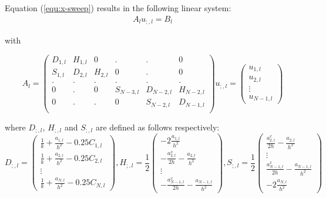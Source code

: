 \documentclass[12pt]{article}
\begin{document}
Equation (\ref{equ:x-sweep}) results in the following linear system:
\begin{eqnarray}
  A_l u_{;,l} = B_l
  \label{equ:xsweep_lin}
\end{eqnarray}



with
 
\[ A_l = \left( \begin{array}{cccccc}
D_{1,l} & H_{1,l} & 0 & . & . & 0\\
S_{1,l} & D_{2,l} & H_{2,l} & 0 & . & 0 \\
. & . & . & . & .& . \\
0 & . & 0 & S_{N-3,l} & D_{N-2,l} & H_{N-2,l}\\
0 & . & . & 0 & S_{N-2,l} & D_{N-1,l}\\
\end{array} \right)
%
u_{;,l} = \left( \begin{array}{c}
  u_{1,l} \\
  u_{2,l} \\
  \vdots \\
  u_{N-1,l}
   \end{array}
\right)
\]


where $D_{;,l}$, $H_{;,l}$ and $S_{;,l}$ are defined as follows respectively: 
\[ D_{;,l} = \left( \begin{array}{c}
  \frac{1}{k} + \frac{a_{1,l}}{h^2} - 0.25 C_{1,l} \\
  \frac{1}{k} + \frac{a_{2,l}}{h^2} - 0.25 C_{2,l} \\
  \vdots \\
  \frac{1}{k} + \frac{a_{N,l}}{h^2} - 0.25 C_{N,l}
  \end{array} \right),
%
 H_{;,l} = \frac{1}{2}\left( \begin{array}{c}
  -2\frac{a_{1,l}}{h^2} \\
  -\frac{a^x_{2,l}}{2h} - \frac{a_{2,l}}{h^2} \\
  \vdots \\
  -\frac{a^x_{N-1,l}}{2h} - \frac{a_{N-1,l}}{h^2}
   \end{array}
\right),  
%
S_{;,l} = \frac{1}{2} \left( \begin{array}{c}
  \frac{a^x_{2,l}}{2h} - \frac{a_{2,l}}{h^2} \\
  \vdots \\
  \frac{a^x_{N-1,l}}{2h} - \frac{a_{N-1,l}}{h^2} \\
  -2\frac{a_{N, l}}{h^2}
  
   \end{array}
\right)\]
\end{document}

